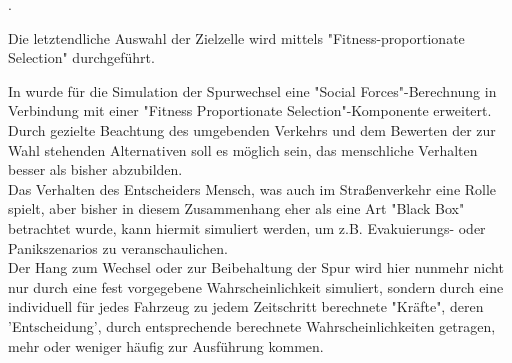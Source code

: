.

Die letztendliche Auswahl der Zielzelle wird mittels "Fitness-proportionate Selection" durchgeführt.


In \cite{dat-ba} wurde für die Simulation der Spurwechsel eine "Social Forces"-Berechnung in Verbindung mit einer "Fitness Proportionate Selection"-Komponente erweitert. 
Durch gezielte Beachtung des umgebenden Verkehrs und dem Bewerten der zur Wahl stehenden Alternativen soll es möglich sein, das menschliche Verhalten besser als bisher abzubilden. \\
Das Verhalten des Entscheiders Mensch, was auch im Straßenverkehr eine Rolle spielt, aber bisher in diesem Zusammenhang eher als eine Art "Black Box" betrachtet wurde, kann hiermit simuliert werden, um z.B. Evakuierungs- oder Panikszenarios zu veranschaulichen.\\
Der Hang zum Wechsel oder zur Beibehaltung der Spur wird hier nunmehr nicht nur durch eine fest vorgegebene Wahrscheinlichkeit simuliert, sondern durch eine individuell für jedes Fahrzeug zu jedem Zeitschritt berechnete "Kräfte", deren 'Entscheidung', durch entsprechende berechnete Wahrscheinlichkeiten getragen, mehr oder weniger häufig zur Ausführung kommen. 